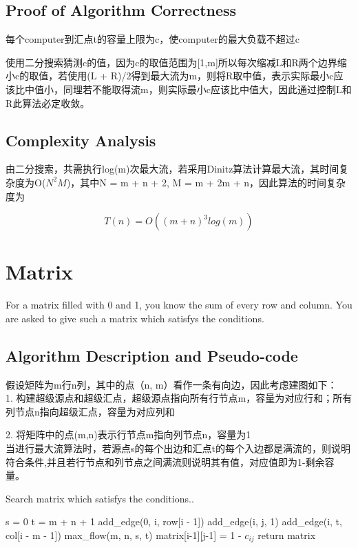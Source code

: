 \documentclass{article}
\begin{document}
\begin{CJK*}{UTF8}{gbsn}
\subsection{Proof of Algorithm Correctness}
每个computer到汇点t的容量上限为c，使computer的最大负载不超过c

使用二分搜索猜测c的值，因为c的取值范围为[1,m]所以每次缩减L和R两个边界缩小c的取值，若使用(L + R)/2得到最大流为m，则将R取中值，表示实际最小c应该比中值小，同理若不能取得流m，则实际最小c应该比中值大，因此通过控制L和R此算法必定收敛。

\subsection{Complexity Analysis}
由二分搜索，共需执行log(m)次最大流，若采用Dinitz算法计算最大流，其时间复杂度为O($N^2M$)，其中N = m + n + 2, M = m + 2m + n，因此算法的时间复杂度为

\begin{equation}
T(n) = O((m + n)^3log(m))
\end{equation}

\newpage
\section{Matrix}
For a matrix filled with 0 and 1, you know the sum of every row and column. You are asked to give such a matrix which satisfys the conditions.


\subsection{Algorithm Description and Pseudo-code}
假设矩阵为m行n列，其中的点（n, m）看作一条有向边，因此考虑建图如下：\\

1. 构建超级源点和超级汇点，超级源点指向所有行节点m，容量为对应行和；所有列节点n指向超级汇点，容量为对应列和

2. 将矩阵中的点(m,n)表示行节点m指向列节点n，容量为1\\

当进行最大流算法时，若源点s的每个出边和汇点t的每个入边都是满流的，则说明符合条件,并且若行节点和列节点之间满流则说明其有值，对应值即为1-剩余容量。

\begin{algorithm}[htbp]  
  \caption{Search matrix which satisfys the conditions..}  
  \begin{algorithmic}[1] 
	\State s = 0
	\State t = m + n + 1
	\State add\_edge(0, i, row[i - 1])
	\State add\_edge(i, j, 1)
	\EndFor
	\EndFor
	\State add\_edge(i, t, col[i - m - 1])
	\EndFor
	\State max\_flow(m, n, s, t)
	\State matrix[i-1][j-1] = 1 - $c_{ij}$
	\EndFor
	\EndFor
	\State return matrix
    \EndFunction 
  \end{algorithmic}  
\end{algorithm} 


\end{CJK*}
\end{document}
